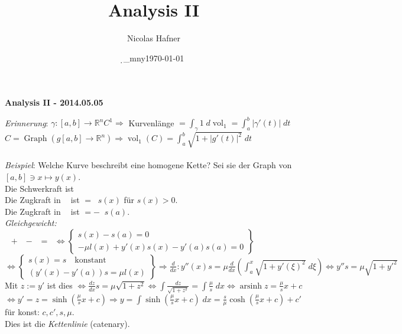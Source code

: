 \documentclass[12pt,a4paper,titlepage]{article}
\author{Nicolas Hafner}
\title{Analysis II}
\date{\d_mny\today}
\newcommand{\arsinh}{\operatorname{arsinh}}
\newcommand{\setR}{\mathbb{R}}
\newcommand{\Graph}{\operatorname{Graph}}
\newcommand{\vol}{\operatorname{vol}}
\newcommand{\twovec}[2]{\mathop{\left(\substack{#1 \\ #2}\right)}}
\begin{document}
	
\begin{center}{\bfseries\Huge Analysis II - 2014.05.05}\end{center}
\textit{Erinnerung}: $\gamma:[a,b]\to\setR^nC^1 \Rightarrow$ Kurvenlänge $=\int_\gamma1 \;d\vol_1=\int_a^b|\gamma'(t)| \;dt$ \\
$C=\Graph(g[a,b]\to\setR^n) \Rightarrow \vol_1(C)=\int_a^b\sqrt{1+|g'(t)|^2} \;dt$ \\
\\
\textit{Beispiel}: Welche Kurve beschreibt eine homogene Kette? Sei sie der Graph von \\
$[a,b]\ni x\mapsto y(x)$. \\
Die Schwerkraft ist $\twovec{0}{-\mu\vol_1(\Graph(y|_{[a,x]}))}$ \\
Die Zugkraft in $\twovec{x}{y}$ ist $=\twovec{1}{y'}s(x)$ für $s(x)>0$. \\
Die Zugkraft in $\twovec{a}{y(a)}$ ist $=-\twovec{1}{y'(a)}s(a)$. \\
\textit{Gleichgewicht:} $\twovec{0}{-\mu l(x)}+\twovec{s(x)}{y'(x)s(x)}-\twovec{s(a)}{y'(a)s(a)}=\twovec{0}{0} \iff \left\{\substack{s(x)-s(a)=0 \\ -\mu l(x)+y'(x)s(x)-y'(a)s(a)=0}\right\}$ \\
$\iff\left\{\substack{s(x)=s \quad \text{konstant} \\ (y'(x)-y'(a))s=\mu l(x)}\right\} \Rightarrow \frac{d}{dx}: y''(x)s=\mu\frac{d}{dx}(\int_a^x\sqrt{1+y'(\xi)^2} \;d\xi) \iff y''s=\mu\sqrt{1+y'^2}$ \\
Mit $z:=y'$ ist dies $\iff \frac{dz}{dx}s=\mu\sqrt{1+z^2} \iff \int\frac{dz}{\sqrt{1+z^2}}= \int\frac{\mu}{s} \;dx \iff \arsinh z = \frac{\mu}{s}x+c$ \\
$\iff y'=z=\sinh(\frac{\mu}{s}x+c) \Rightarrow y=\int\sinh(\frac{\mu}{s}x+c) \;dx = \frac{s}{\mu}\cosh(\frac{\mu}{s}x+c)+c'$ für konst: $c,c',s,\mu$. \\
Dies ist die \emph{Kettenlinie} (catenary).
\end{document}
